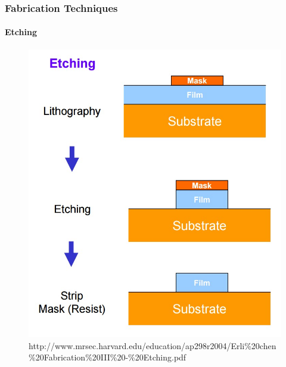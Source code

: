 \documentclass{beamer}
\begin{document}

\begin{frame}
    \frametitle{Fabrication Techniques}
    \framesubtitle{Etching}
    \begin{figure}[ht!]
        \centering
        \includegraphics[height=0.6\textheight]{img/etching.jpg}
        \caption{http://www.mrsec.harvard.edu/education/ap298r2004/Erli\%20chen\%20Fabrication\%20III\%20-\%20Etching.pdf}
    \end{figure}
\end{frame}

\end{document}
